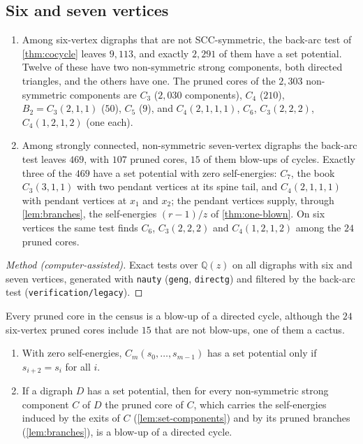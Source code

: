 \documentclass[final]{siamart0516}
\numberwithin{theorem}{section}
\numberwithin{equation}{section}
\theoremstyle{siamnonum}
\theoremstyle{plain}
\newcommand{\code}[1]{{\ttfamily\nolinkurl{#1}}}
\newcommand{\QQ}{\mathbb{Q}}
\newcommand{\Qz}{\QQ(z)}
\begin{document}
\subsection{Six and seven vertices}

\begin{proposition}\label{prop:census67}
\begin{enumerate}[label=\textup{(\arabic*)}]
\item Among six-vertex digraphs that are not SCC-symmetric, the back-arc test of \cref{thm:cocycle} leaves $9{,}113$, and exactly $2{,}291$ of them have a set potential. Twelve of these have two non-symmetric strong components, both directed triangles, and the others have one. The pruned cores of the $2{,}303$ non-symmetric components are $C_3$ ($2{,}030$ components), $C_4$ ($210$), $B_2=C_3(2,1,1)$ ($50$), $C_5$ ($9$), and $C_4(2,1,1,1)$, $C_6$, $C_3(2,2,2)$, $C_4(1,2,1,2)$ (one each).
\item Among strongly connected, non-symmetric seven-vertex digraphs the back-arc test leaves $469$, with $107$ pruned cores, $15$ of them blow-ups of cycles. Exactly three of the $469$ have a set potential with zero self-energies: $C_7$, the book $C_3(3,1,1)$ with two pendant vertices at its spine tail, and $C_4(2,1,1,1)$ with pendant vertices at $x_1$ and $x_2$; the pendant vertices supply, through \cref{lem:branches}, the self-energies $(r-1)/z$ of \cref{thm:one-blown}. On six vertices the same test finds $C_6$, $C_3(2,2,2)$ and $C_4(1,2,1,2)$ among the $24$ pruned cores.
\end{enumerate}
\end{proposition}
\begin{proof}[Method \textup{(computer-assisted)}]
Exact tests over $\Qz$ on all digraphs with six and seven vertices, generated with \code{nauty} (\code{geng}, \code{directg}) and filtered by the back-arc test (\code{verification/legacy}).
\end{proof}

Every pruned core in the census is a blow-up of a directed cycle, although the $24$ six-vertex pruned cores include $15$ that are not blow-ups, one of them a cactus.

\begin{conjecture}\label{conj:blowups}
\begin{enumerate}[label=\textup{(\arabic*)}]
\item With zero self-energies, $C_m(s_0,\dots,s_{m-1})$ has a set potential only if $s_{i+2}=s_i$ for all $i$.
\item If a digraph $D$ has a set potential, then for every non-symmetric strong component $C$ of $D$ the pruned core of $C$, which carries the self-energies induced by the exits of $C$ (\cref{lem:set-components}) and by its pruned branches (\cref{lem:branches}), is a blow-up of a directed cycle.
\end{enumerate}
\end{conjecture}
\end{document}
